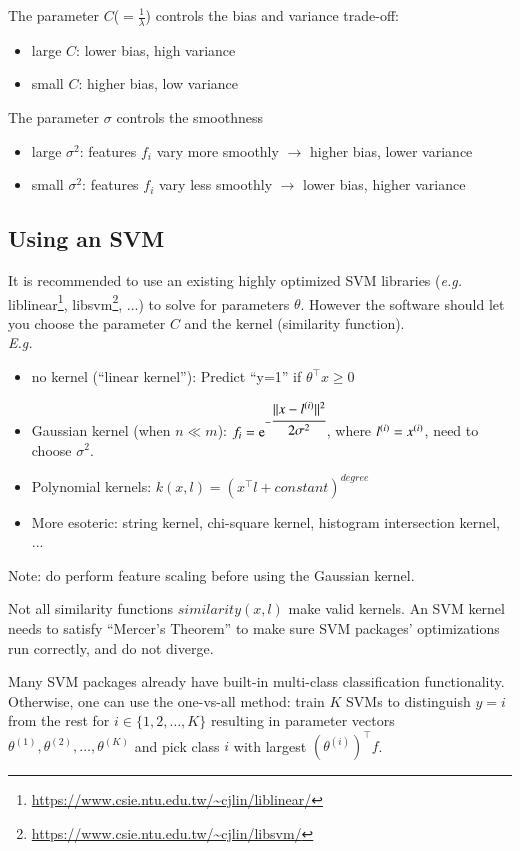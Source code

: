 \documentclass[a4paper,twoside,10pt]{article}
\begin{document}
The parameter $C$($=\frac{1}{\lambda}$) controls the bias and variance trade-off:
\begin{itemize}
  \item large $C$: lower bias, high variance
  \item small $C$: higher bias, low variance
\end{itemize}
The parameter $\sigma$ controls the smoothness
\begin{itemize}
  \item large $\sigma^2$: features $f_i$ vary more smoothly $\rightarrow$ higher bias, lower variance
  \item small $\sigma^2$: features $f_i$ vary less smoothly $\rightarrow$ lower bias, higher variance
\end{itemize}

\subsection{Using an SVM}
It is recommended to use an existing highly optimized \ac{SVM} libraries (\emph{e.g.}
liblinear\footnote{\url{https://www.csie.ntu.edu.tw/~cjlin/liblinear/}},
libsvm\footnote{\url{https://www.csie.ntu.edu.tw/~cjlin/libsvm/}}, ...) to solve for parameters $\theta$.
However the software should let you choose the parameter $C$ and the kernel (similarity function).\\
\emph{E.g.}
\begin{itemize}
  \item no kernel (``linear kernel''): Predict ``y=1'' if $\theta^\top x\ge 0$
  \item Gaussian kernel (when $n\ll m$): $f_i=\operatorname{e}^{-\cfrac{||x-l^{(i)}||^2}{2\sigma^2}}$, where $l^{(i)}=x^{(i)}$, need to choose $\sigma^2$.
  \item Polynomial kernels: $k(x,l)=(x^\top l+constant)^{degree}$
  \item More esoteric: string kernel, chi-square kernel, histogram intersection kernel, ...
\end{itemize}
Note: do perform feature scaling before using the Gaussian kernel.

Not all similarity functions $similarity(x,l)$ make valid kernels.
An \ac{SVM} kernel needs to satisfy ``Mercer's Theorem'' to make sure \ac{SVM} packages' optimizations run correctly, and do not diverge.

Many \ac{SVM} packages already have built-in multi-class classification functionality.
Otherwise, one can use the one-vs-all method: train $K$ \acp{SVM} to distinguish $y=i$ from the rest for $i\in\{1,2,\ldots,K\}$ resulting in parameter vectors $\theta^{(1)},\theta^{(2)},\ldots,\theta^{(K)}$ and pick class $i$ with largest $(\theta^{(i)})^\top f$.
\end{document}
